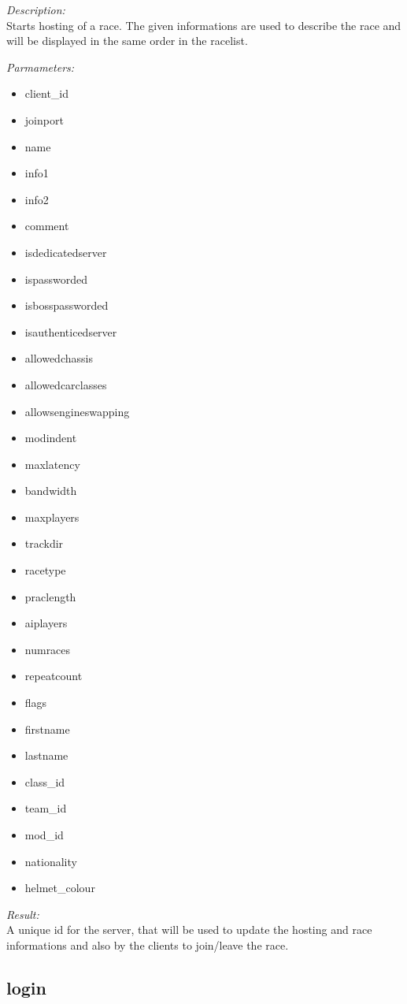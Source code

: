 \begin{description}
\item {\it Description:}\\
Starts hosting of a race. The given informations are used to describe the race and will be displayed in the same order in the racelist.
\item {\it Parmameters:}
\begin{itemize}
\item client\_id
\item joinport
\item name
\item info1
\item info2
\item comment
\item isdedicatedserver
\item ispassworded
\item isbosspassworded
\item isauthenticedserver
\item allowedchassis
\item allowedcarclasses
\item allowsengineswapping
\item modindent
\item maxlatency
\item bandwidth
\item maxplayers
\item trackdir
\item racetype
\item praclength
\item aiplayers
\item numraces
\item repeatcount
\item flags
\item firstname
\item lastname
\item class\_id
\item team\_id
\item mod\_id
\item nationality
\item helmet\_colour
\end{itemize}
\item {\it Result:}\\
A unique id for the server, that will be used to update the hosting and race informations and also by the clients to join/leave the race.
\end{description}

\subsection{login}

